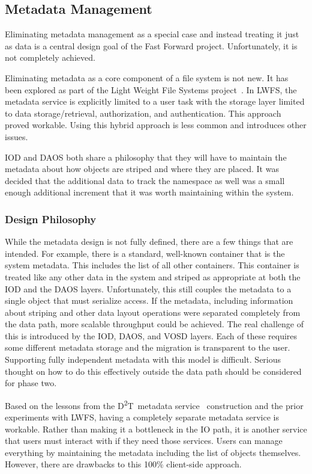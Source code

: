 \documentclass[conference]{IEEEtran}
\newcommand{\DDT}{D\textsuperscript{2}T~}
\begin{document}
\subsection{Metadata Management}
Eliminating metadata management as a special case and instead treating it just
as data is a central design goal of the Fast Forward project. Unfortunately,
it is not completely achieved.

Eliminating metadata as a core component of a file system is not new. It has
been explored as part of the Light Weight File Systems
project~\cite{oldfield:lwfs}. In LWFS, the metadata service is explicitly
limited to a user task with the storage layer limited to data
storage/retrieval, authorization, and authentication. This approach proved
workable. Using this hybrid approach is less common and introduces other
issues.

IOD and DAOS both share a philosophy that they will have to maintain the
metadata about how objects are striped and where they are placed. It was
decided that the additional data to track the namespace as well was a small
enough additional increment that it was worth maintaining within the system.

\subsubsection{Design Philosophy}
While the metadata design is not fully defined, there are a few things that
are intended. For example, there is a standard, well-known container that is
the system metadata. This includes the list of all other containers. This
container is treated like any other data in the system and striped as
appropriate at both the IOD and the DAOS layers. Unfortunately, this still
couples the metadata to a single object that must serialize access. If the
metadata, including information about striping and other data layout operations
were separated completely from the data path, more scalable throughput could be
achieved. The real challenge of this is introduced by the IOD, DAOS, and VOSD
layers. Each of these requires some different metadata storage and the
migration is transparent to the user. Supporting fully independent metadata
with this model is difficult. Serious thought on how to do this effectively
outside the data path should be considered for phase two.

Based on the lessons from the \DDT metadata
service~\cite{lofstead:2012:txn-metadata} construction and the prior
experiments with LWFS, having a completely separate metadata service is
workable. Rather than making it a bottleneck in the IO path, it is another
service that users must interact with if they need those services.  Users can
manage everything by maintaining the metadata including the list of objects
themselves. However, there are drawbacks to this 100\% client-side approach.
\end{document}
